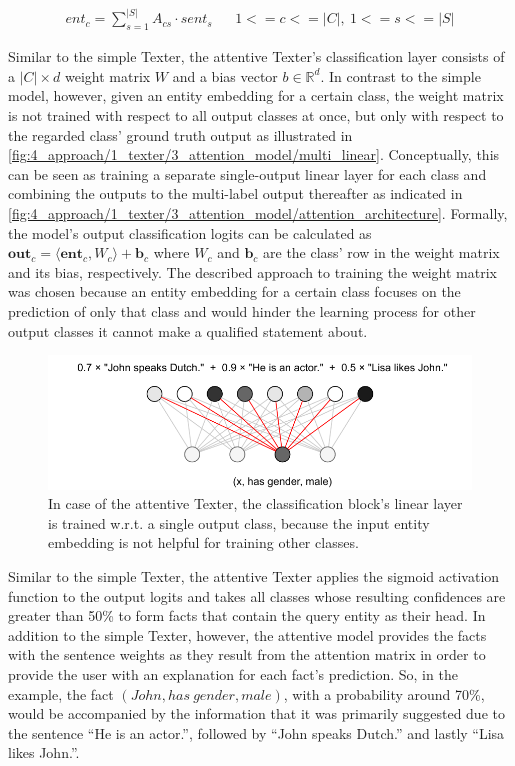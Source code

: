 \begin{align}
    ent_c = \sum_{s = 1}^{|S|} A_{cs} \cdot sent_s && 1 <= c <= |C|,~1 <= s <= |S|
    \label{eq:4_approach/1_texter/3_attention_model/ent_emb}
\end{align}

Similar to the simple Texter, the attentive Texter's classification layer consists of a $|C| \times d$ weight matrix $W$ and a bias vector $b \in \mathbb{R}^d$. In contrast to the simple model, however, given an entity embedding for a certain class, the weight matrix is not trained with respect to all output classes at once, but only with respect to the regarded class' ground truth output as illustrated in \autoref{fig:4_approach/1_texter/3_attention_model/multi_linear}.  Conceptually, this can be seen as training a separate single-output linear layer for each class and combining the outputs to the multi-label output thereafter as indicated in \autoref{fig:4_approach/1_texter/3_attention_model/attention_architecture}. Formally, the model's output classification logits can be calculated as $\textbf{out}_c = \langle \textbf{ent}_c, W_c \rangle + \textbf{b}_c$ where $W_c$ and $\textbf{b}_c$ are the class' row in the weight matrix and its bias, respectively. The described approach to training the weight matrix was chosen because an entity embedding for a certain class focuses on the prediction of only that class and would hinder the learning process for other output classes it cannot make a qualified statement about.

\begin{figure}[t]
    \centering
    \includegraphics{4_approach/1_texter/3_attention_model/multi_linear}
    \caption{In case of the attentive Texter, the classification block's linear layer is trained w.r.t. a single output class, because the input entity embedding is not helpful for training other classes.}
    \label{fig:4_approach/1_texter/3_attention_model/multi_linear}
\end{figure}

Similar to the simple Texter, the attentive Texter applies the sigmoid activation function to the output logits and takes all classes whose resulting confidences are greater than 50\% to form facts that contain the query entity as their head. In addition to the simple Texter, however, the attentive model provides the facts with the sentence weights as they result from the attention matrix in order to provide the user with an explanation for each fact's prediction. So, in the example, the fact $(John, has~gender, male)$, with a probability around 70\%, would be accompanied by the information that it was primarily suggested due to the sentence ``He is an actor.'', followed by ``John speaks Dutch.'' and lastly ``Lisa likes John.''.

